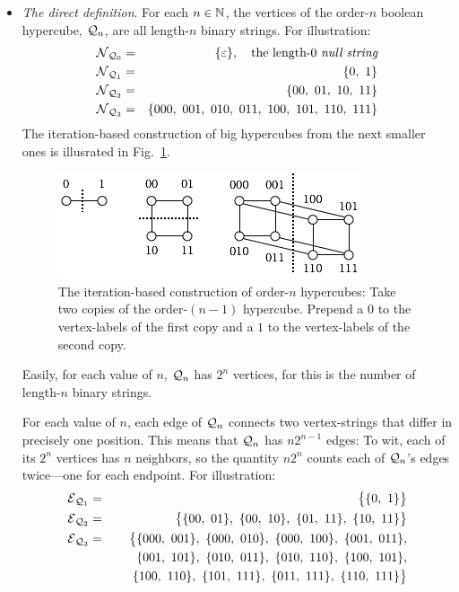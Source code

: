\begin{itemize}
\item
{\it The direct definition}.
For each $n \in \mathbb{N}$, the vertices of the order-$n$ boolean hypercube,
$\mbox{$\cal Q$}_n$, are all length-$n$ binary strings.  For illustration:
\begin{eqnarray*}
\mbox{$\cal N$}_{{\mbox{{\scriptsize $\cal Q$}}}_0}
  & = & 
\{ \varepsilon \}, \ \ \mbox{ the length-$0$ {\em null string}} \\ 
\mbox{$\cal N$}_{{\mbox{{\scriptsize $\cal Q$}}}_1}
  & = &
\{ 0, \ 1 \} \\
\mbox{$\cal N$}_{{\mbox{{\scriptsize $\cal Q$}}}_2}
  & = & \{ 00, \ 01, \ 10, \ 11 \} \\
\mbox{$\cal N$}_{{\mbox{{\scriptsize $\cal Q$}}}_3}
  & = & \{ 000, \ 001, \ 010, \ 011, \ 100, \ 101, \ 110, \ 111 \} 
\end{eqnarray*}
The iteration-based construction of big hypercubes from the next
smaller ones is illusrated in Fig.~\ref{fig:hypercube}.
\begin{figure}[hbt]
\begin{center}
       \includegraphics[scale=0.6]{FiguresGraph/hypercube}
\caption{The iteration-based construction of order-$n$ hypercubes:
  Take two copies of the order-$(n-1)$ hypercube.  Prepend a $0$ to
  the vertex-labels of the first copy and a $1$ to the vertex-labels of
  the second copy.}
  \label{fig:hypercube}
\end{center}
\end{figure}

Easily, for each value of $n$, $\mbox{$\cal Q$}_n$ has $2^n$ vertices, for this is the
number of length-$n$ binary strings.

\medskip

For each value of $n$, each edge of $\mbox{$\cal Q$}_n$ connects two vertex-strings
that differ in precisely one position.  This means that $\mbox{$\cal Q$}_n$ has $n
2^{n-1}$ edges: To wit, each of its $2^n$ vertices has $n$ neighbors, so
the quantity $n 2^n$ counts each of $\mbox{$\cal Q$}_n$'s edges twice---one for
each endpoint.  For illustration:
\begin{eqnarray*}
\mbox{$\cal E$}_{{\mbox{{\scriptsize $\cal Q$}}}_1}
  & = &
\big\{ \{ 0, \ 1 \} \big\} \\
\mbox{$\cal E$}_{{\mbox{{\scriptsize $\cal Q$}}}_2}
  & = & \big\{
\{ 00, \ 01 \}, \ \{ 00, \ 10\}, \
\{ 01, \ 11 \}, \ \{ 10, \ 11\} 
\big\} \\
\mbox{$\cal E$}_{{\mbox{{\scriptsize $\cal Q$}}}_3}
  & = & \big\{ 
\{000, \ 001\}, \
\{000, \ 010\}, \
\{000, \ 100\}, \
\{001, \ 011\}, \\
  &  & \hspace*{.2in}
\{001, \ 101\}, \
\{010, \ 011\}, \
\{010, \ 110\}, \
\{100, \ 101\}, \\
  &  & \hspace*{.2in}
\{100, \ 110\}, \
\{101, \ 111\}, \
\{011, \ 111\}, \
\{110, \ 111\}
\big\}
\end{eqnarray*}
\end{itemize}

